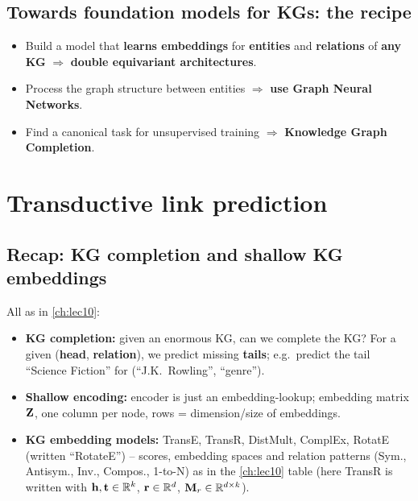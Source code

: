 \subsection{Towards foundation models for KGs: the recipe}\label{sec:lec15-recipe}

\begin{keyidea}[slide 22]
  \begin{itemize}
    \item Build a model that \textbf{learns embeddings} for \textbf{entities} and
      \textbf{relations} of \textbf{any KG} $\Rightarrow$ \textbf{double equivariant
      architectures}.
    \item Process the graph structure between entities $\Rightarrow$ \textbf{use Graph
      Neural Networks}.
    \item Find a canonical task for unsupervised training $\Rightarrow$
      \textbf{Knowledge Graph Completion}.
  \end{itemize}
\end{keyidea}

\section{Transductive link prediction}\label{sec:lec15-trans}

\subsection{Recap: KG completion and shallow KG embeddings}\label{sec:lec15-recap}

All as in \cref{ch:lec10}:
\begin{itemize}
  \item \textbf{KG completion:} given an enormous KG, can we complete the KG? For a given
    (\textbf{head}, \textbf{relation}), we predict missing \textbf{tails}; e.g.\ predict
    the tail ``Science Fiction'' for (``J.K.\ Rowling'', ``genre'').
  \item \textbf{Shallow encoding:} encoder is just an embedding-lookup; embedding matrix
    $\mathbf{Z}$, one column per node, rows = dimension/size of embeddings.
  \item \textbf{KG embedding models:} TransE, TransR, DistMult, ComplEx, RotatE (written
    ``RotateE'') -- scores, embedding spaces and relation patterns (Sym., Antisym.,
    Inv., Compos., 1-to-N) as in the \cref{ch:lec10} table (here TransR is written with
    $\mathbf{h},\mathbf{t}\in\mathbb{R}^k$, $\mathbf{r}\in\mathbb{R}^d$, $\mathbf{M}_r\in\mathbb{R}^{d\times k}$).
\end{itemize}


